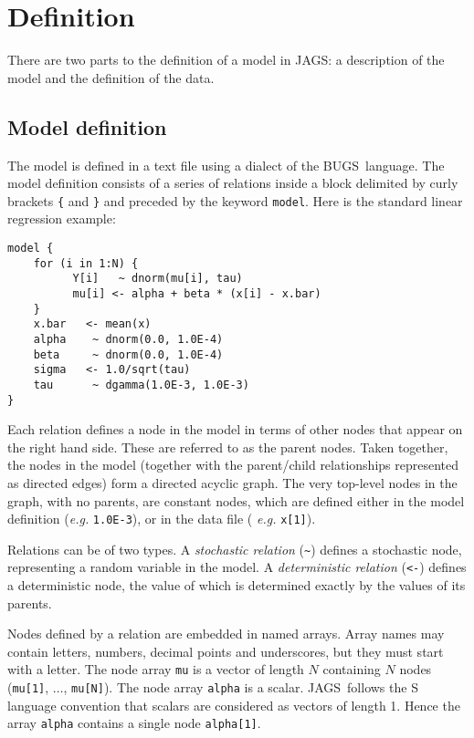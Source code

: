 \documentclass[11pt, a4paper, titlepage]{report}
\newcommand{\JAGS}{\textsf{JAGS}}
\newcommand{\BUGS}{\textsf{BUGS}}
\begin{document}
\section{Definition}

There are two parts to the definition of a model in \JAGS: a
description of the model and the definition of the data.

\subsection{Model definition}

The model is defined in a text file using a dialect of the
\BUGS\ language.  The model definition consists of a series of
relations inside a block delimited by curly brackets \verb+{+ and
\verb+}+ and preceded by the keyword \verb+model+. Here is the standard
linear regression example:

\begin{verbatim}
model {
    for (i in 1:N) {
          Y[i]   ~ dnorm(mu[i], tau)
          mu[i] <- alpha + beta * (x[i] - x.bar)
    }
    x.bar   <- mean(x)
    alpha    ~ dnorm(0.0, 1.0E-4)
    beta     ~ dnorm(0.0, 1.0E-4)
    sigma   <- 1.0/sqrt(tau)
    tau      ~ dgamma(1.0E-3, 1.0E-3)
}
\end{verbatim}

Each relation defines a node in the model in terms of other nodes that
appear on the right hand side. These are referred to as the parent
nodes. Taken together, the nodes in the model (together with the
parent/child relationships represented as directed edges) form a
directed acyclic graph. The very top-level nodes in the graph, with no
parents, are constant nodes, which are defined either in the model
definition ({\em e.g.}  \verb+1.0E-3+), or in the data file ({\em
  e.g.}  \verb+x[1]+).

Relations can be of two types. A {\em stochastic relation} (\verb+~+)
defines a stochastic node, representing a random variable in the
model. A {\em deterministic relation} (\verb+<-+) defines a
deterministic node, the value of which is determined exactly by the
values of its parents.

Nodes defined by a relation are embedded in named arrays. Array names may
contain letters, numbers, decimal points and underscores, but they must
start with a letter.  The node array \verb+mu+ is a vector of length
$N$ containing $N$ nodes (\verb+mu[1]+, $\ldots$, \verb+mu[N]+). The
node array \verb+alpha+ is a scalar.  \JAGS\ follows the S language
convention that scalars are considered as vectors of length 1. Hence
the array \verb+alpha+ contains a single node \verb+alpha[1]+.
\end{document}
